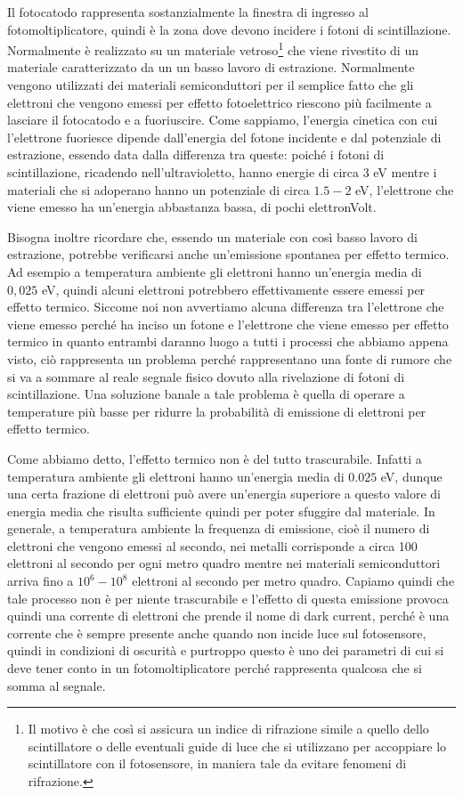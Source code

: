 Il fotocatodo rappresenta sostanzialmente la finestra di ingresso al fotomoltiplicatore, quindi è la zona dove devono incidere i fotoni di scintillazione. Normalmente è realizzato su un materiale vetroso\footnote{Il motivo è che così si assicura un indice di rifrazione simile a quello dello scintillatore o delle eventuali guide di luce che si utilizzano per accoppiare lo scintillatore con il fotosensore, in maniera tale da evitare fenomeni di rifrazione.} che viene rivestito di un materiale caratterizzato da un un basso lavoro di estrazione. Normalmente vengono utilizzati dei materiali semiconduttori per il semplice fatto che gli elettroni che vengono emessi per effetto fotoelettrico riescono più facilmente a lasciare il fotocatodo e a fuoriuscire. Come sappiamo, l'energia cinetica con cui l'elettrone fuoriesce dipende dall'energia del fotone incidente e dal potenziale di estrazione, essendo data dalla differenza tra queste: poiché i fotoni di scintillazione, ricadendo nell'ultravioletto, hanno energie di circa 3 eV mentre i materiali che si adoperano hanno un potenziale di circa $1.5-2$ eV, l'elettrone che viene emesso ha un'energia abbastanza bassa, di pochi elettronVolt.

Bisogna inoltre ricordare che, essendo un materiale con così basso lavoro di estrazione, potrebbe verificarsi anche un'emissione spontanea per effetto termico. Ad esempio a temperatura ambiente gli elettroni hanno un'energia media di $0,025$ eV, quindi alcuni elettroni potrebbero effettivamente essere emessi per effetto termico. Siccome noi non avvertiamo alcuna differenza tra l'elettrone che viene emesso perché ha inciso un fotone e l'elettrone che viene emesso per effetto termico in quanto entrambi daranno luogo a tutti i processi che abbiamo appena visto, ciò rappresenta un problema perché rappresentano una fonte di rumore che si va a sommare al reale segnale fisico dovuto alla rivelazione di fotoni di scintillazione. Una soluzione banale a tale problema è quella di operare a temperature più basse per ridurre la probabilità di emissione di elettroni per effetto termico.

Come abbiamo detto, l'effetto termico non è del tutto trascurabile. Infatti a temperatura ambiente gli elettroni hanno un'energia media di $0.025$ eV, dunque una certa frazione di elettroni può avere un'energia superiore a questo valore di energia media che risulta sufficiente quindi per poter sfuggire dal materiale. In generale, a temperatura ambiente la frequenza di emissione, cioè il numero di elettroni che vengono emessi al secondo, nei metalli corrisponde a circa 100 elettroni al secondo per ogni metro quadro mentre nei materiali semiconduttori arriva fino a $10^6-10^8$ elettroni al secondo per metro quadro. Capiamo quindi che tale processo non è per niente trascurabile e l'effetto di questa emissione provoca quindi una corrente di elettroni che prende il nome di dark current, perché è una corrente che è sempre presente anche quando non incide luce sul fotosensore, quindi in condizioni di oscurità e purtroppo questo è uno dei parametri di cui si deve tener conto in un fotomoltiplicatore perché rappresenta qualcosa che si somma al segnale.

